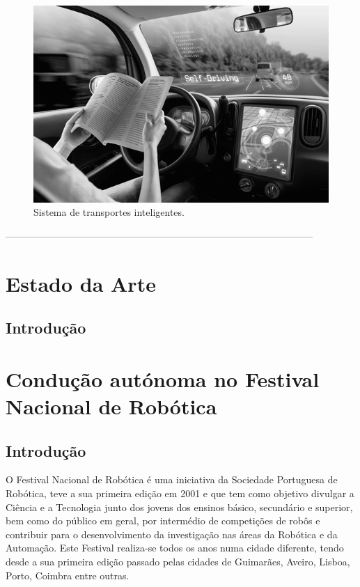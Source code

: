 \documentclass[a4paper,10pt]{texRel}
\begin{document}
\begin{figure}[H]
\centering
\includegraphics{future3.png}
\caption{Sistema de transportes inteligentes.}
\label{fig_futuro3}
\end{figure}


-----------------------------------------------------------------------------------------------\\


\chapter{Estado da Arte}


\section{Introdução}



\chapter{Condução autónoma no Festival Nacional de Robótica}

\section{Introdução}

O Festival Nacional de Robótica é uma iniciativa da Sociedade Portuguesa de Robótica, teve a sua primeira edição em 2001 e que tem como objetivo divulgar a Ciência e a Tecnologia junto dos jovens dos ensinos básico, secundário e superior, bem como do público em geral, por intermédio de competições de robôs e contribuir para o desenvolvimento da investigação nas áreas da Robótica e da Automação. Este Festival realiza-se todos os anos numa cidade diferente, tendo desde a sua primeira edição passado pelas cidades de Guimarães, Aveiro, Lisboa, Porto, Coimbra entre outras. 
\end{document}
